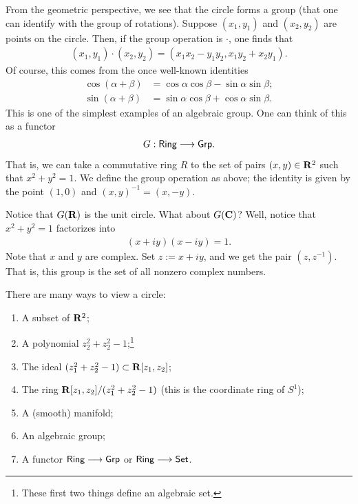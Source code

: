 \documentclass [11 pt, oneside] {article}
\begin{document}
From the geometric perspective, we see that the circle forms a group (that one can identify with the group of rotations). Suppose $(x_1,y_1)$ and $(x_2,y_2)$ are points on the circle. Then, if the group operation is $\cdot$, one finds that
\begin{align*}
	(x_1,y_1) \cdot (x_2,y_2) = (x_1x_2-y_1y_2, x_1y_2+x_2y_1).
\end{align*}
Of course, this comes from the once well-known identities
\begin{align*}
	\cos(\alpha+\beta) &=\cos\alpha \cos\beta- \sin \alpha \sin \beta;\\
	\sin(\alpha + \beta) &= \sin\alpha \cos\beta + \cos \alpha \sin \beta.
\end{align*}
This is one of the simplest examples of an algebraic group. One can think of this as a functor
\begin{align*}
	G : \textsf{Ring} \longrightarrow \textsf{Grp}.
\end{align*}
That is, we can take a commutative ring $R$ to the set of pairs $(x,y)\in \mathbf R^2$ such that $x^2+y^2=1$. We define the group operation as above; the identity is given by the point $(1,0)$ and $(x,y) ^{-1} = (x,-y)$.

Notice that $G(\mathbf R)$ is the unit circle. What about $G(\mathbf C)$? Well, notice that $x^2+y^2 =1$ factorizes into
\begin{align*}
	(x+iy) (x-iy) = 1.
\end{align*}
Note that $x$ and $y$ are complex. Set $z := x+iy$, and we get the pair $(z,z^{-1})$. That is, this group is the set of all nonzero complex numbers.

There are many ways to view a circle:
\begin{enumerate}
	\item A subset of $\mathbf R^2$;
	\item A polynomial $z_2^2 + z_2^2 -1$;\footnote{These first two things define an algebraic set.}
	\item The ideal $(z_1^2+z_2^2-1)\subset \mathbf R[z_1,z_2]$;
	\item The ring $\mathbf R[z_1,z_2] / (z_1^2+z_2^2-1)$ (this is the coordinate ring of $S^1$);
	\item A (smooth) manifold;
	\item An algebraic group;
	\item A functor $\textsf{Ring}\longrightarrow \textsf{Grp}$ or $\textsf{Ring} \longrightarrow \textsf{Set}$.
\end{enumerate}
\end{document}

